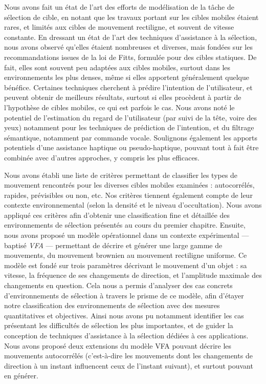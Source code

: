 	Nous avons fait un état de l'art des efforts de modélisation de la tâche de sélection de cible, en notant que les travaux portant sur les cibles mobiles étaient rares, et limités aux cibles de mouvement rectiligne, et souvent de vitesse constante. En dressant un état de l'art des techniques d'assistance à la sélection, nous avons observé qu'elles étaient nombreuses et diverses, mais fondées sur les recommandations issues de la loi de Fitts, formulée pour des cibles statiques. De fait, elles sont souvent peu adaptées aux cibles mobiles, surtout dans les environnements les plus denses, même si elles apportent généralement quelque bénéfice. Certaines techniques cherchent à prédire l'intention de l'utilisateur, et peuvent obtenir de meilleurs résultats, surtout si elles procèdent à partir de l'hypothèse de cibles mobiles, ce qui est parfois le cas. Nous avons noté le potentiel de l'estimation du regard de l'utilisateur (par suivi de la tête, voire des yeux) notamment pour les techniques de prédiction de l'intention, et du filtrage sémantique, notamment par commande vocale. Soulignons également les apports potentiels d'une assistance haptique ou pseudo-haptique, pouvant tout à fait être combinée avec d'autres approches, y compris les plus efficaces.
	
	Nous avons établi une liste de critères permettant de classifier les types de mouvement rencontrés pour les diverses cibles mobiles examinées : autocorrélés, rapides, prévisibles ou non, etc. Nos critères tiennent également compte de leur contexte environnemental (selon la densité et le niveau d'occultation). Nous avons appliqué ces critères afin d'obtenir une classification fine et détaillée des environnements de sélection présentés au cours du premier chapitre. Ensuite, nous avons proposé un modèle opérationnel dans un contexte expérimental --- baptisé \emph{VFA} --- permettant de décrire et générer une large gamme de mouvements, du mouvement brownien au mouvement rectiligne uniforme. Ce modèle est fondé sur trois paramètres décrivant le mouvement d'un objet : sa vitesse, la fréquence de ses changements de direction, et l'amplitude maximale des changements en question. Cela nous a permis d'analyser des cas concrets d'environnements de sélection à travers le prisme de ce modèle, afin d'étayer notre classification des environnements de sélection avec des mesures quantitatives et objectives. Ainsi nous avons pu notamment identifier les cas présentant les difficultés de sélection les plus importantes, et de guider la conception de techniques d'assistance à la sélection dédiées à ces applications. Nous avons proposé deux extensions du modèle VFA pouvant décrire les mouvements autocorrélés (c'est-à-dire les mouvements dont les changements de direction à un instant influencent ceux de l'instant suivant), et surtout pouvant en générer.
	
